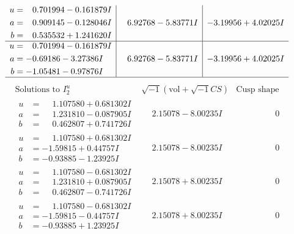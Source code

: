 \documentclass[1p]{elsarticle_modified}
\theoremstyle{definition}
\newcommand{\I}{\sqrt{-1}}
\begin{document}
$$\begin{array}{c|c|c}
\begin{aligned}
u &= \phantom{-}0.701994 - 0.161879 I \\
a &= \phantom{-}0.909145 - 0.128046 I \\
b &= \phantom{-}0.535532 + 1.241620 I\end{aligned}
 & \phantom{-}6.92768 - 5.83771 I & -3.19956 + 4.02025 I \\ \hline\begin{aligned}
u &= \phantom{-}0.701994 - 0.161879 I \\
a &= -0.69186 - 3.27386 I \\
b &= -1.05481 - 0.97876 I\end{aligned}
 & \phantom{-}6.92768 - 5.83771 I & -3.19956 + 4.02025 I\\
 \hline 
 \end{array}$$\newpage$$\begin{array}{c|c|c}  
\text{Solutions to }I^u_{2}& \I (\text{vol} + \sqrt{-1}CS) & \text{Cusp shape}\\
 \hline 
\begin{aligned}
u &= \phantom{-}1.107580 + 0.681302 I \\
a &= \phantom{-}1.231810 - 0.087905 I \\
b &= \phantom{-}0.462807 + 0.741726 I\end{aligned}
 & \phantom{-}2.15078 - 8.00235 I & \phantom{-0.000000 } 0 \\ \hline\begin{aligned}
u &= \phantom{-}1.107580 + 0.681302 I \\
a &= -1.59815 + 0.44757 I \\
b &= -0.93885 - 1.23925 I\end{aligned}
 & \phantom{-}2.15078 - 8.00235 I & \phantom{-0.000000 } 0 \\ \hline\begin{aligned}
u &= \phantom{-}1.107580 - 0.681302 I \\
a &= \phantom{-}1.231810 + 0.087905 I \\
b &= \phantom{-}0.462807 - 0.741726 I\end{aligned}
 & \phantom{-}2.15078 + 8.00235 I & \phantom{-0.000000 } 0 \\ \hline\begin{aligned}
u &= \phantom{-}1.107580 - 0.681302 I \\
a &= -1.59815 - 0.44757 I \\
b &= -0.93885 + 1.23925 I\end{aligned}
 & \phantom{-}2.15078 + 8.00235 I & \phantom{-0.000000 } 0 \\ \hline\begin{aligned}

\end{aligned}
\end{array}$$
\end{document}
